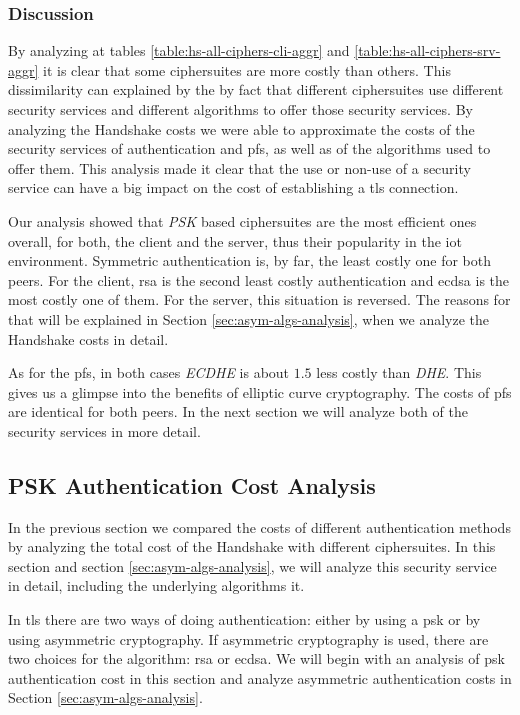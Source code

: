 \documentclass{llncs}
\begin{document}
\subsubsection{Discussion}

By analyzing at tables \ref{table:hs-all-ciphers-cli-aggr}
and \ref{table:hs-all-ciphers-srv-aggr} it is clear that some ciphersuites are more costly than others. This dissimilarity
can explained by the by fact that different ciphersuites use different security services and different algorithms to
offer those security services. By analyzing the Handshake costs we were able to approximate the costs of the security
services of authentication and \gls{pfs}, as well as of the algorithms used to offer them. This analysis made it clear that the
use or non-use of a security service can have a big impact on the cost of establishing a \gls{tls} connection.

Our analysis showed that \textit{PSK} based ciphersuites are the most efficient ones overall, for both, the client
and the server, thus their popularity in the \gls{iot} environment. Symmetric authentication is, by far,
the least costly one for both peers. For the client, \gls{rsa} is the second least costly authentication and \gls{ecdsa}
is the most costly one of them. For the server, this situation is reversed. The reasons for that will be explained in
Section \ref{sec:asym-algs-analysis}, when we analyze the Handshake costs in detail.

As for the \gls{pfs}, in both cases \textit{ECDHE} is about $1.5$ less costly than \textit{DHE}. This gives us a glimpse
into the benefits of elliptic curve cryptography. The costs of \gls{pfs} are identical for both peers. In the next
section we will analyze both of the security services in more detail.

\subsection{PSK Authentication Cost Analysis} \label{sec:psk-cost-analysis}

In the previous section we compared the costs of different authentication methods by analyzing the total cost of the
Handshake with different ciphersuites. In this section and section \ref{sec:asym-algs-analysis}, we will analyze this 
security service in detail, including the underlying algorithms it. 

In \gls{tls} there are two ways of doing authentication: either by using a \gls{psk} or by using asymmetric cryptography.
If asymmetric cryptography is used, there are two choices for the algorithm: \gls{rsa} or \gls{ecdsa}. We will begin 
with an analysis of \gls{psk} authentication cost in this section and analyze asymmetric authentication costs 
in Section \ref{sec:asym-algs-analysis}.
\end{document}
